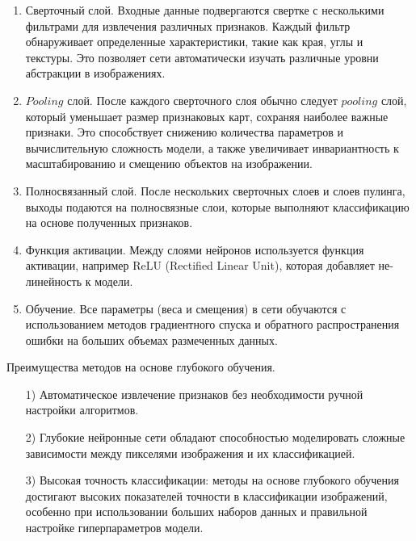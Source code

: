 \begin{enumerate}
	\item Сверточный слой. Входные данные подвергаются свертке с несколькими
	фильтрами для извлечения различных признаков. Каждый фильтр обнаруживает определенные
	характеристики, такие как края, углы и текстуры. Это позволяет сети
	автоматически изучать различные уровни абстракции в изображениях.
	
	\item $Pooling$ слой. После каждого сверточного слоя обычно следует
	$pooling$ слой, который уменьшает размер признаковых карт, сохраняя
	наиболее важные признаки. Это способствует снижению количества параметров и
	вычислительную сложность модели, а также увеличивает инвариантность к
	масштабированию и смещению объектов на изображении.
	
	\item Полносвязанный слой. После нескольких сверточных слоев и слоев пулинга,
	выходы подаются на полносвязные слои, которые выполняют классификацию на
	основе полученных признаков.
	
	\item Функция активации. Между слоями нейронов используется функция
	активации, например ReLU (Rectified Linear Unit)\cite{relu}, которая добавляет
	не-\\линейность к модели.
	
	\item Обучение. Все параметры (веса и смещения) в сети обучаются с
	использованием методов градиентного спуска\cite{gradient-descent} и обратного
	распространения ошибки\cite{backpropagation} на больших объемах
	размеченных данных.
\end{enumerate}

\newpage

Преимущества методов на основе глубокого обучения.
\begin{itemize}[leftmargin=1.6\parindent]
	\item[1)] Автоматическое извлечение признаков без необходимости ручной настройки алгоритмов.
	\item[2)] Глубокие нейронные сети обладают способностью моделировать сложные зависимости между пикселями изображения и их классификацией.
	\item[3)]Высокая точность классификации: методы на основе глубокого обучения  достигают высоких показателей точности в классификации изображений, особенно при использовании больших наборов данных и правильной настройке гиперпараметров модели.
\end{itemize}


